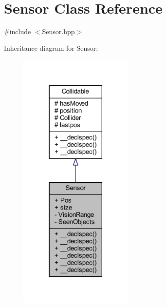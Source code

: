 \hypertarget{class_sensor}{\section{Sensor Class Reference}
\label{class_sensor}
}


{\ttfamily \#include $<$Sensor.\-hpp$>$}



Inheritance diagram for Sensor\-:
\nopagebreak
\begin{figure}[H]
\begin{center}
\leavevmode
\includegraphics[width=161pt]{class_sensor__inherit__graph}
\end{center}
\end{figure}


